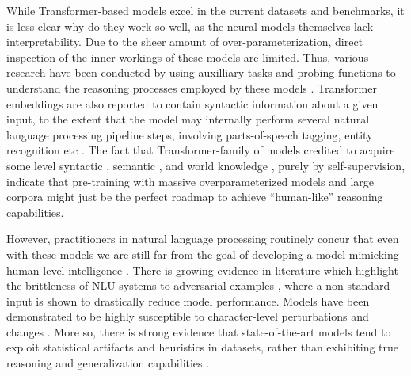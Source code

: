 \documentclass[letterpaper, 12pt]{report}
\begin{document}
While Transformer-based models excel in the current datasets and benchmarks, it is less clear why do they work so well, as the neural models themselves lack interpretability. Due to the sheer amount of over-parameterization, direct inspection of the inner workings of these models are limited. Thus, various research have been conducted by using auxilliary tasks and probing functions to understand the reasoning processes employed by these models \citep{rogers2020}. Transformer embeddings are also reported to contain syntactic information about a given input, to the extent that the model may internally perform several natural language processing pipeline steps, involving parts-of-speech tagging, entity recognition etc \citep{tenney-etal-2019-bert}. The fact that Transformer-family of models credited to acquire some level syntactic \citep{hewitt-manning-2019-structural,jawahar-etal-2019-bert}, semantic \citep{ettinger2020}, and world knowledge \citep{petroni-etal-2019-language, rogers2020}, purely by self-supervision, indicate that pre-training with massive overparameterized models and large corpora might just be the perfect roadmap to achieve ``human-like'' reasoning capabilities.

However, practitioners in natural language processing routinely concur that even with these models we are still far from the goal of developing a model mimicking human-level intelligence \citep{kiela-etal-2021-dynabench}. There is growing evidence in literature which highlight the brittleness of NLU systems to adversarial examples \citep{jia2016,jin2020bert,ettinger-etal-2017-towards,ettinger-2020-whatbertisnot,ribeiro-etal-2020-beyond}, where a non-standard input is shown to drastically reduce model performance. Models have been demonstrated to be highly susceptible to character-level perturbations and changes \citep{ebrahimi-etal-2018-adversarial,minervini-riedel-2018-adversarially,ebrahimi-etal-2018-hotflip,wallace-etal-2019-universal}.
More so, there is strong evidence that state-of-the-art models tend to exploit statistical artifacts and heuristics in datasets, rather than exhibiting true reasoning and generalization capabilities \citep{gururangan2018a,poliak-etal-2018-hypothesis,tsuchiya-2018-performance,naik-etal-2018-stress,mccoy2019}.
\end{document}
